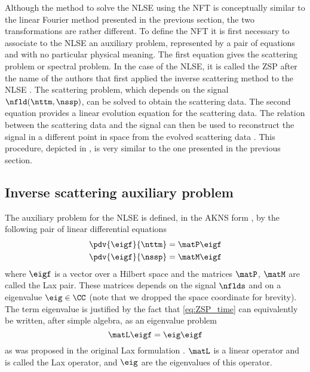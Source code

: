 Although the method to solve the \ac{NLSE} using the \ac{NFT} is conceptually
similar to the linear Fourier method presented in the previous section, the two
transformations are rather different.
To define the \ac{NFT} it is first necessary to associate to the \ac{NLSE} an auxiliary problem, represented by a pair of equations and with no particular physical meaning. The first equation gives the scattering problem or
spectral problem. In the case of the \ac{NLSE},
it is called the \ac{ZSP} after the name of the authors that first applied the
inverse scattering method to the \ac{NLSE} \cite{shabat1972exact}.
The scattering problem, which depends on the signal $\nfld(\nttm, \nssp)$, can
be solved to obtain the scattering data.
The second equation provides a linear evolution equation for the scattering data. The relation between the
scattering data and the signal can then be used to reconstruct the signal in a
different point in space from the evolved scattering data
\cite{desbruslais1996inverse}. This procedure, depicted in
, is very similar to the one presented in the
previous section.


\subsection{Inverse scattering auxiliary problem}
The auxiliary problem for the \ac{NLSE} is defined, in the \ac{AKNS} form \cite{ablowitz1974inverse}, by
the following pair of linear differential equations
\begin{subequations}\label{eq:ZSP}
  \begin{align}
    \pdv{\eigf}{\nttm} & = \matP \eigf\label{eq:ZSP_time} \\
    \pdv{\eigf}{\nssp} & = \matM \eigf\label{eq:ZSP_space_evolution}
  \end{align}
\end{subequations}
where $\eigf$ is a vector over a Hilbert space and the matrices $\matP$, $\matM$
are called the Lax pair. These matrices depends on the signal $\nflds$ and
on a eigenvalue $\eig \in \CC$ (note that we dropped the space coordinate for brevity). The term eigenvalue is justified by the fact that \eqref{eq:ZSP_time} can equivalently be
written, after simple algebra, as an eigenvalue problem
\begin{equation}
 \matL\eigf = \eig\eigf\label{eq:eigenvalue_problem}
\end{equation}
as was proposed in the original Lax formulation \cite{lax1968integrals}. $\matL$
is a linear operator and is called the Lax operator, and $\eig$ are the
eigenvalues of this operator.


